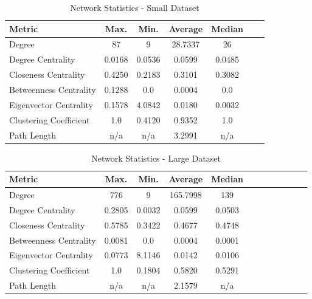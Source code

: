 \documentclass[conference]{IEEEtran}
\begin{document}
\begin{table}[hbt!]
\centering
\caption{Network Statistics - Small Dataset}
\label{table:kysymys}
\begin{tabularx}{\textwidth}{@{} l *{5}{C} c @{}}

        \toprule
        Metric & Max. & Min. & Average & Median \\
        \midrule
        Degree & 87 & 9 & 28.7337 & 26 \\
        Degree Centrality & 0.0168 & 0.0536 & 0.0599 & 0.0485 \\
        Closeness Centrality & 0.4250 & 0.2183 & 0.3101 & 0.3082 \\
        Betweenness Centrality & 0.1288 & 0.0 & 0.0004 & 0.0 \\
        Eigenvector Centrality & 0.1578 & 4.0842 & 0.0180 & 0.0032 \\
        Clustering Coefficient & 1.0 & 0.4120 & 0.9352 & 1.0 \\
        Path Length & n/a & n/a & 3.2991 & n/a \\
        \bottomrule
        
    \end{tabularx}
    
\end{table}

\begin{table}[hbt!]
\centering
\caption{Network Statistics - Large Dataset}
\label{table:kysymys}
\begin{tabularx}{\textwidth}{@{} l *{10}{C} c @{}}

        \toprule
        Metric & Max. & Min. & Average & Median \\
        \midrule
        Degree & 776 & 9 & 165.7998 & 139 \\
        Degree Centrality & 0.2805 & 0.0032 & 0.0599 & 0.0503 \\
        Closeness Centrality & 0.5785 & 0.3422 & 0.4677 & 0.4748 \\
        Betweenness Centrality & 0.0081 & 0.0 & 0.0004 & 0.0001 \\
        Eigenvector Centrality & 0.0773 & 8.1146 & 0.0142 & 0.0106 \\
        Clustering Coefficient & 1.0 & 0.1804 & 0.5820 & 0.5291 \\
        Path Length & n/a & n/a & 2.1579 & n/a \\
        \bottomrule
        
    \end{tabularx}

\end{table}
\end{document}
